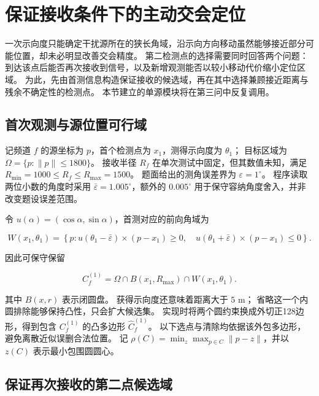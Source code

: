 \section{保证接收条件下的主动交会定位}\label{sec:q2}

一次示向度只能确定干扰源所在的狭长角域，沿示向方向移动虽然能够接近部分可能位置，却未必明显改善交会精度。
第二检测点的选择需要同时回答两个问题：到达该点后能否再次接收到信号，以及新增观测能否以较小移动代价缩小定位区域。
为此，先由首测信息构造保证接收的候选域，再在其中选择兼顾接近距离与残余不确定性的检测点。
本节建立的单源模块将在第三问中反复调用。

\subsection{首次观测与源位置可行域}\label{sec:q2-1}

记频道 \(f\) 的源坐标为 \(p\)，首个检测点为 \(x_1\)，测得示向度为 \(\theta_1\)；
目标区域为 \(\Omega=\{p:\|p\|\le1800\}\)。
接收半径 \(R_f\) 在单次测试中固定，但其数值未知，满足 \(R_{\min}=1000\le R_f\le R_{\max}=1500\)。
题面给出的测角误差界为 \(\varepsilon=1^\circ\)。
程序读取两位小数的角度时采用 \(\bar\varepsilon=1.005^\circ\)，额外的 \(0.005^\circ\) 用于保守容纳角度舍入，并非改变题设误差范围。

令 \(u(\alpha)=(\cos\alpha,\sin\alpha)\)，首测对应的前向角域为

\begin{equation}\label{eq:q2-1}
W(x_1,\theta_1)=\left\{p:
u(\theta_1-\bar\varepsilon)\times(p-x_1)\ge0,\quad
u(\theta_1+\bar\varepsilon)\times(p-x_1)\le0
\right\}.
\end{equation}

因此可保守保留

\begin{equation}\label{eq:q2-2}
C_f^{(1)}=\Omega\cap B(x_1,R_{\max})\cap W(x_1,\theta_1).
\end{equation}

其中 \(B(x,r)\) 表示闭圆盘。
获得示向度还意味着距离大于 \(5\) m；
省略这一个内圆排除能够保持凸性，只会扩大候选集。
实现时将两个圆约束换成外切正128边形，得到包含 \(C_f^{(1)}\) 的凸多边形 \(\widehat C_f^{(1)}\)。
以下选点与清除均依据该外包多边形，避免离散近似误删合法位置。
记 \(\rho(C)=\min_z\max_{p\in C}\|p-z\|\)，并以 \(z(C)\) 表示最小包围圆圆心。

\subsection{保证再次接收的第二点候选域}\label{sec:q2-2}

